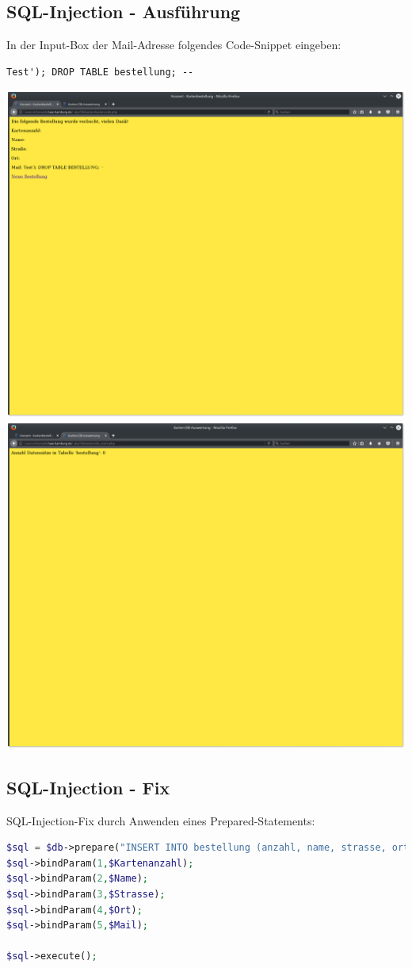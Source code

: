 \documentclass[a4paper,10pt]{article}
\begin{document}
\subsection{SQL-Injection - Ausführung}
In der Input-Box der Mail-Adresse folgendes Code-Snippet eingeben:
\begin{verbatim}
Test'); DROP TABLE bestellung; --
\end{verbatim}
\includegraphics[scale=0.3]{sqli1.png}
\includegraphics[scale=0.3]{sqli2.png}
\subsection{SQL-Injection - Fix}
SQL-Injection-Fix durch Anwenden eines Prepared-Statements:
\begin{lstlisting}[language=php]
$sql = $db->prepare("INSERT INTO bestellung (anzahl, name, strasse, ort, mail) VALUES (?,?,?,?,?)");
$sql->bindParam(1,$Kartenanzahl);
$sql->bindParam(2,$Name);
$sql->bindParam(3,$Strasse);
$sql->bindParam(4,$Ort);
$sql->bindParam(5,$Mail);

$sql->execute();

\end{lstlisting}
\end{document}
